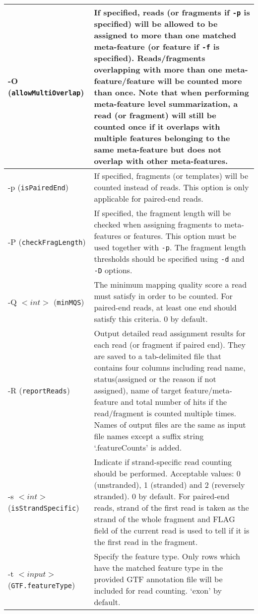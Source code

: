 \documentclass[12pt]{report}
\newcommand{\code}[1]{{\small\texttt{#1}}}
\begin{document}
\begin{longtable}{|p{5cm}|p{11cm}|}
\hline
-O \newline (\code{allowMultiOverlap}) & If specified, reads (or fragments if \code{-p} is specified) will be allowed to be assigned to more than one matched meta-feature (or feature if \code{-f} is specified). Reads/fragments overlapping with more than one meta-feature/feature will be counted more than once. Note that when performing meta-feature level summarization, a read (or fragment) will still be counted once if it overlaps with multiple features belonging to the same meta-feature but does not overlap with other meta-features. \\
\hline
-p \newline (\code{isPairedEnd}) & If specified, fragments (or templates) will be counted instead of reads. This option is only applicable for paired-end reads.\\
\hline
-P \newline (\code{checkFragLength}) & If specified, the fragment length will be checked when assigning fragments to meta-features or features. This option must be used together with \code{-p}. The fragment length thresholds should be specified using \code{-d} and \code{-D} options.\\
\hline
-Q $<int>$ \newline (\code{minMQS}) & The minimum mapping quality score a read must satisfy in order to be counted. For paired-end reads, at least one end should satisfy this criteria. 0 by default.\\
\hline
-R \newline (\code{reportReads}) & Output detailed read assignment results for each read (or fragment if paired end). They are saved to a tab-delimited file that contains four columns including read name, status(assigned or the reason if not assigned), name of target feature/meta-feature and total number of hits if the read/fragment is counted multiple times. Names of output files are the same as input file names except a suffix string `.featureCounts' is added.\\
\hline
-s $<int>$ \newline (\code{isStrandSpecific}) & Indicate if strand-specific read counting should be performed. Acceptable values:  0 (unstranded), 1 (stranded) and 2 (reversely stranded). 0 by default. For paired-end reads, strand of the first read is taken as the strand of the whole fragment and FLAG field of the current read is used to tell if it is the first read in the fragment.\\
\hline
-t $<input>$ \newline (\code{GTF.featureType}) & Specify the feature type. Only rows which have the matched feature type in the provided GTF annotation file will be included for read counting. `exon' by default.\\

\end{longtable}
\end{document}
